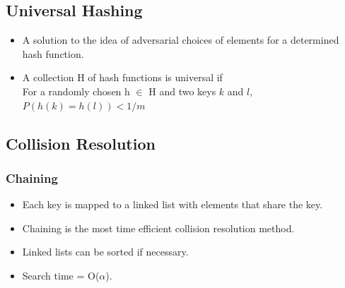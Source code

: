 \documentclass{report}
\begin{document}
\subsection{Universal Hashing}
\begin{itemize}
\item A solution to the idea of adversarial choices of elements for a determined hash function.
\item A collection H of hash functions is universal if \\
For a randomly chosen h $\in$ H and two keys $k$ and $l$,\\
$P(h(k)=h(l)) < 1/m$
\end{itemize}
\subsection{Collision Resolution}
\subsubsection{Chaining}
\begin{itemize}
\item Each key is mapped to a linked list with elements that share the key.
\item Chaining is the most time efficient collision resolution method.
\item Linked lists can be sorted if necessary.
\item Search time = O($\alpha$).
\end{itemize}
\end{document}
